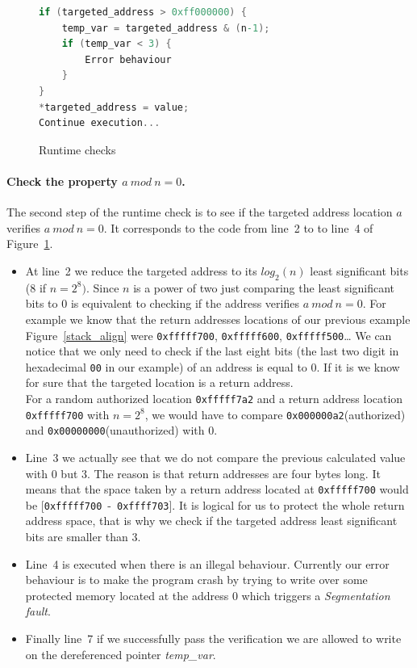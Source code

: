 \documentclass[11pt]{sdm}
\begin{document}
\begin{figure}[!ht]
\centering
\begin{lstlisting}[language=C]
if (targeted_address > 0xff000000) {
	temp_var = targeted_address & (n-1);
	if (temp_var < 3) {
		Error behaviour
	} 
}
*targeted_address = value;
Continue execution...
\end{lstlisting}
\caption{Runtime checks}
\label{classic_check}
\end{figure}

\paragraph{Check the property $a~mod~n=0$.}
\label{par:Classic check}
The second step of the runtime check is to see if the targeted address location $a$ verifies $a~mod~n=0$. It corresponds to the code from line~2 to to line~4 of Figure~\ref{classic_check}.
\begin{itemize}
	\item At line~2 we reduce the targeted address to its $log_2(n)$ least significant bits (8 if $n=2^8)$.
Since $n$ is a power of two just comparing the least significant bits to $0$ is equivalent to checking if the address verifies $a~mod~n=0$.
For example we know that the return addresses locations of our previous example Figure~\ref{stack_align} were \texttt{0xfffff700}, \texttt{0xfffff600}, \texttt{0xfffff500}\dots
We can notice that we only need to check if the last eight bits (the last two digit in hexadecimal \texttt{00} in our example) of an address is equal to 0.
If it is we know for sure that the targeted location is a return address.\\
For a random authorized location \texttt{0xfffff7a2} and a return address location \texttt{0xfffff700} with $n=2^8$, we would have to compare \texttt{0x000000a2}(authorized) and \texttt{0x00000000}(unauthorized) with $0$. 
	\item Line~3 we actually see that we do not compare the previous calculated value with 0 but 3. The reason is that return addresses are four bytes long.
		It means that the space taken by a return address located at \texttt{0xfffff700} would be [\texttt{0xfffff700}~-~\texttt{0xffff703}]. It is logical for us to protect the whole return address space, that is why we check if the targeted address least significant bits are smaller than 3.
	\item Line~4 is executed when there is an illegal behaviour. Currently our error behaviour is to make the program crash by trying to write over some protected memory located at the address 0 which triggers a \textit{Segmentation fault}.
	\item Finally line~7 if we successfully pass the verification we are allowed to write on the dereferenced pointer \textit{temp\_var}.
\end{itemize}
\end{document}
